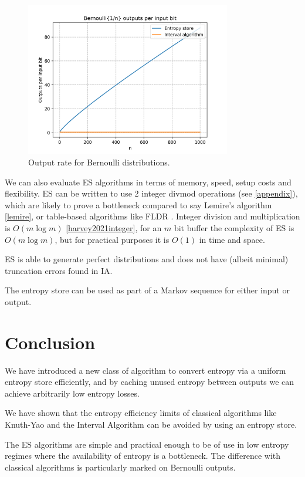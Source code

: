 \documentclass[12pt]{article}
\begin{document}
\begin{figure}[ht]
\centering
\includegraphics[width=0.8\textwidth]{bernoulli_rate.png}
\caption{Output rate for Bernoulli distributions.}
\label{fig:bernoulli-rate}
\end{figure}

We can also evaluate ES algorithms in terms of memory, speed, setup costs and flexibility. ES can be written to use 2 integer divmod operations (see \ref{appendix}), which are likely to prove a bottleneck compared to say Lemire's algorithm \ref{lemire}, or table-based algorithms like FLDR \cite{saad2020fldr,saad2025}. Integer division and multiplication is $O(m \log m)$ \ref{harvey2021integer}, for an $m$ bit buffer the complexity of ES is $O(m \log m)$, but for practical purposes it is $O(1)$ in time and space.

ES is able to generate perfect distributions and does not have (albeit minimal) truncation errors found in IA.

The entropy store can be used as part of a Markov sequence for either input or output.

\section{Conclusion}

We have introduced a new class of algorithm to convert entropy via a uniform entropy store efficiently, and by caching unused entropy between outputs we can achieve arbitrarily low entropy losses.

We have shown that the entropy efficiency limits of classical algorithms like Knuth-Yao and the Interval Algorithm can be avoided by using an entropy store. 

The ES algorithms are simple and practical enough to be of use in low entropy regimes where the availability of entropy is a bottleneck. The difference with classical algorithms is particularly marked on Bernoulli outputs.
\end{document}

